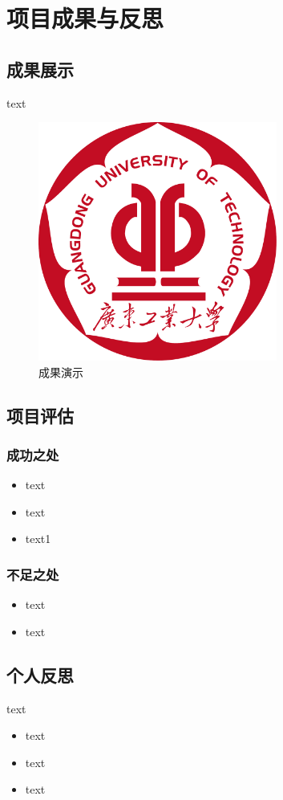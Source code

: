 
\section{项目成果与反思}

\subsection{成果展示}
text
\begin{figure}[h]
    \centering
    \includegraphics[width=0.7\textwidth]{figures/logo.pdf}
    \caption{成果演示}
\end{figure}
\subsection{项目评估}

\subsubsection{成功之处}

\begin{itemize}
    \item text
    \item text
    \item text1
\end{itemize}

\subsubsection{不足之处}
\begin{itemize}
    \item text
    \item text
\end{itemize}

\subsection{个人反思}
text
\begin{itemize}
    \item text
    \item text
    \item text
\end{itemize}
